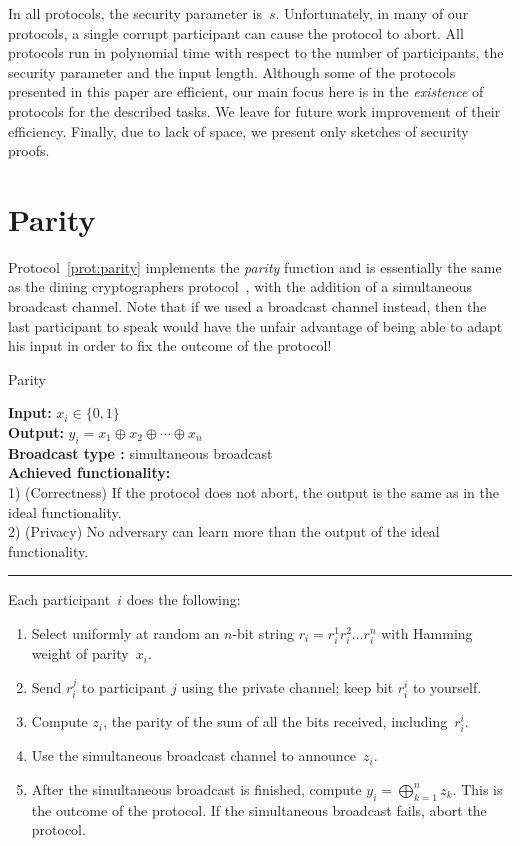 \documentclass[11pt]{article}
\begin{document}
In all protocols, the security parameter is~$s$. Unfortunately, in
many of our protocols, a single corrupt participant can cause the
protocol to abort. All protocols run in polynomial time with respect
to the number of participants, the security parameter and the input
length. Although some of the protocols presented in this paper are
efficient, our main focus here is in the \emph{existence} of
protocols for the described tasks. We leave for future work
improvement of their efficiency. Finally, due to lack of space, we
present only sketches of security proofs.


\section{Parity}
\label{sec:parity}



Protocol~\ref{prot:parity} implements the \emph{parity} function
and is essentially the same as the dining cryptographers
protocol~\cite{Chaum88}, with the addition of a simultaneous
broadcast channel. Note that if we used a broadcast channel instead,
then the last participant to speak would have the unfair advantage
of being able to adapt his input in order to fix the outcome of the
protocol!


\begin{protocol} \caption{Parity} \label{prot:parity}
{\bf Input:} $x_i\in\{0,1\}$ \\
{\bf Output:} $y_i=x_1 \oplus x_2 \oplus \cdots  \oplus x_n$ \\
{\bf Broadcast type :} simultaneous broadcast \\
{\bf Achieved functionality:} \\
1) (Correctness) If the protocol does not abort, the output is the same as in the ideal functionality.  \\
2) (Privacy) No adversary can learn more than the output of the
ideal functionality. \vspace{2pt}
 \hrule  \vspace{2pt}
Each participant~$i$ does the
following:
\begin{enumerate}
\item \label{ParityStep1} Select uniformly at random an $n$-bit  string $r_i = r_i^1r_i^2\ldots r_i^n$ with Hamming weight of parity~$x_i$.
\item Send $r_i^j$ to participant $j$ using the private channel;
keep bit $r_i^i$ to yourself.
\item Compute $z_i$, the parity of the sum of all the bits  received, including~$r_i^i$.
\item Use the simultaneous broadcast channel to announce~$z_i$.
\label{step:broadcast}
\item \label{step:compute}After the simultaneous broadcast is finished, compute $y_i= \bigoplus_{k=1}^{n} z_k $. This is the outcome of the protocol.
If the simultaneous broadcast fails, abort the protocol.
\end{enumerate}
\end{protocol}
\end{document}
